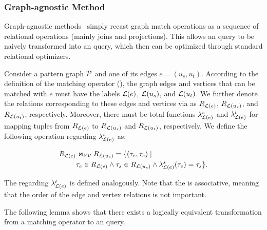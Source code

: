 \subsubsection{Graph-agnostic Method}
\label{sec:intuitive-method}
Graph-agnostic methods~\cite{apache-age,DuckPGQ,DuckPGQ-VLDB} simply recast graph match operations
as a sequence of relational operations (mainly joins and projections). This allows an \spjm query to be naively transformed into an \spj query, which then can be optimized through standard relational optimizers.

Consider a pattern graph $\mathcal{P}$ and one of its edges $e = (u_s, u_t)$. According to the definition of the matching operator (), the graph edges and vertices that can be matched with $e$ must have the labels $\mathcal{L}(e)$, $\mathcal{L}(u_s)$, and $\mathcal{L}(u_t)$. We further denote the relations corresponding to these edges and vertices via \rgmapping as $R_{\mathcal{L}(e)}$, $R_{\mathcal{L}(u_s)}$, and $R_{\mathcal{L}(u_t)}$, respectively. Moreover, there must be total functions $\lambda_{\mathcal{L}(e)}^s$ and $\lambda_{\mathcal{L}(e)}^t$ for mapping tuples from $R_{\mathcal{L}(e)}$ to $R_{\mathcal{L}(u_s)}$ and $R_{\mathcal{L}(u_t)}$, respectively. We define the following \EVjoin operation regarding $\lambda_{\mathcal{L}(e)}^s$ as:

\begin{equation} \label{eq:ev-join}
\begin{split}
R_{\mathcal{L}(e)} & \Join_\mathcal{EV} R_{\mathcal{L}(u_s)} = \{(\tau_e, \tau_s) \;|\; \\
  &  \tau_e \in R_{\mathcal{L}(e)} \land \tau_s \in R_{\mathcal{L}(u_s)} \land \lambda_{\mathcal{L}(e)}^s(\tau_e) = \tau_s\}.
\end{split}
\end{equation}

The \EVjoin regarding $\lambda_{\mathcal{L}(e)}^t$ is defined analogously. Note that the \EVjoin is associative, meaning that the order of the edge and vertex relations is not important.


The following lemma shows that there exists a logically equivalent transformation from a matching operator to an \spj query.

